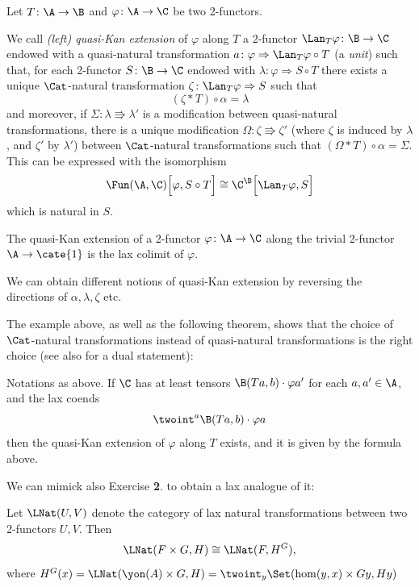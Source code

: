 Let $T\colon \A\to \B$ and $\varphi\colon \A\to \C$ be two 2-functors.
\begin{definition}
We call \emph{(left) quasi-Kan extension} of $\varphi$ along $T$ a 2-functor $\Lan_T\varphi\colon \B\to \C$ endowed with a quasi-natural transformation $a\colon \varphi \Rightarrow \Lan_T\varphi\circ T$ (a \emph{unit}) such that, for each 2-functor $S\colon \B\to \C$ endowed with $\lambda \colon \varphi \Rightarrow S\circ T$ there exists a unique $\Cat$-natural transformation $\zeta\colon \Lan_T\varphi \Rightarrow S$ such that 
\[
(\zeta * T)\circ \alpha = \lambda 
\]
and moreover, if $\Sigma\colon \lambda \Rrightarrow \lambda'$ is a modification between quasi-natural transformations, there is a unique modification $\Omega\colon \zeta\Rrightarrow \zeta'$ (where $\zeta$ is induced by $\lambda$, and $\zeta'$ by $\lambda'$) between $\Cat$-natural transformations such that $(\Omega * T)\circ \alpha = \Sigma$. This can be expressed with the isomorphism
\[
\Fun(\A, \C)\Big[ \varphi, S\circ T \Big]\cong \C^{\B}\Big[ \Lan_T\varphi, S \Big]
\]
which is natural in $S$.
\end{definition}
\begin{example}
The quasi-Kan extension of a 2-functor $\varphi\colon \A\to\C$ along the trivial 2-functor $\A\to \cate{1}$ is the lax colimit of $\varphi$.
\end{example}
\begin{remark}
We can obtain different notions of quasi-Kan extension by reversing the directions of $\alpha, \lambda, \zeta$ etc.

The example above, as well as the following theorem, shows that the choice of $\Cat$-natural transformations instead of quasi-natural transformations is the right choice (see also \cite{bozapalides1980some} for a dual statement):
\end{remark}
\begin{theorem}\label{pseudolan}
Notations as above. If $\C$ has at least tensors $\B(Ta, b)\cdot \varphi a'$ for each $a, a'\in \A$, and the lax coends
\[
\twoint^a \B(Ta, b)\cdot \varphi a
\]
then the quasi-Kan extension of $\varphi$ along $T$ exists, and it is given by the formula above.
\end{theorem}
We can mimick also Exercise \textbf{2}. to obtain a lax analogue of it:
\begin{proposition}
Let $\LNat(U,V)$ denote the category of lax natural transformations between two 2-functors $U,V$. Then
\[
\LNat(F\times G,H)\cong \LNat(F, H^G),
\]
where $H^G(x) = \LNat(\yon(A)\times G, H) = \twoint_y\Set(\hom(y,x)\times Gy, Hy)$
\end{proposition}
